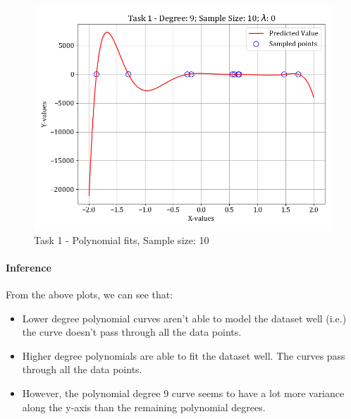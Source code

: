 \documentclass[12pt,a4paper]{article}
\begin{document}
\begin{figure}[H]
    \includegraphics[scale=0.425]{images/t1_d1/d_9_size_10_l_0.png}
    \caption{Task 1 - Polynomial fits, Sample size: 10}
\end{figure}

\paragraph{Inference}
From the above plots, we can see that:
\begin{itemize}
    \itemsep0em
    \item Lower degree polynomial curves aren't able to model the dataset well (i.e.) the curve doesn't pass through all the data points.
    \item Higher degree polynomials are able to fit the dataset well. The curves pass through all the data points.
    \item However, the polynomial degree 9 curve seems to have a lot more variance along the y-axis than the remaining polynomial degrees.
\end{itemize}
\end{document}

